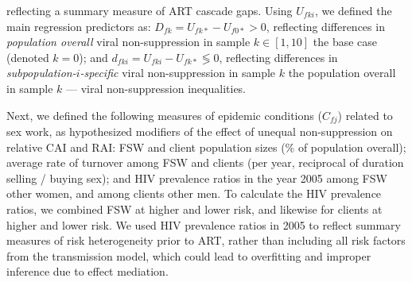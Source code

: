 reflecting a summary measure of ART cascade gaps.
Using $U_{fki}$, we defined the main regression predictors as:
$D_{fk} = U_{fk*} - U_{f0*} > 0$, reflecting differences in
\emph{population overall} viral non-suppression in sample $k \in [1,10]$
\vs the base case (denoted $k = 0$); and
$d_{fki} = U_{fki} - U_{fk*} \lessgtr 0$, reflecting differences in
\emph{subpopulation-$i$-specific} viral non-suppression in sample $k$
\vs the population overall in sample $k$ --- \ie viral non-suppression inequalities.
\par
Next, we defined the following measures of epidemic conditions ($C_{fj}$) related to sex work,
as hypothesized modifiers of the effect of unequal non-suppression on relative CAI and RAI:
FSW and client population sizes (\% of population overall);
average rate of turnover among FSW and clients (per year, reciprocal of duration selling / buying sex); and
HIV prevalence ratios in the year 2005 among FSW \vs other women, and among clients \vs other men.
To calculate the HIV prevalence ratios, we combined FSW at higher and lower risk,
and likewise for clients at higher and lower risk.
We used HIV prevalence ratios in 2005 to reflect summary measures of risk heterogeneity prior to ART,
rather than including all risk factors from the transmission model,
which could lead to overfitting and improper inference due to effect mediation.
